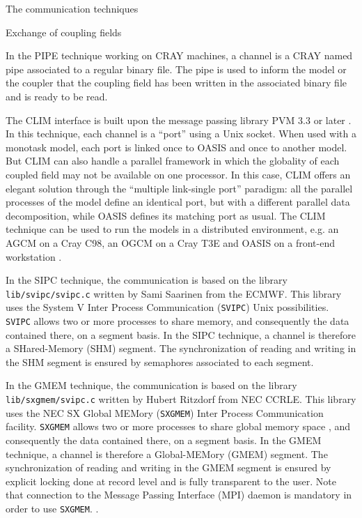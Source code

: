\begin{subsection}{The communication techniques}
\begin{subsubsection}{Exchange of coupling fields}
\vspace{0.4cm}

In the PIPE technique working on CRAY machines, a channel is a CRAY 
named pipe associated to a regular
binary file. The pipe is used to inform the model or the coupler
that the coupling field has been written in the associated binary
file and is ready to be read. 

\vspace{0.4cm}

The CLIM interface is built upon the message passing library PVM 3.3
or later \cite{ecmwf}. In this technique, each channel is a ``port'' using a Unix
socket. When used with a monotask model, each port is
linked once to OASIS and once to another model. But CLIM can also
handle a parallel framework in which the globality of each coupled
field may not be available on one processor. In this case, CLIM offers
an elegant solution through the ``multiple link-single port''
paradigm: all the parallel processes of the model define an identical
port, but with a different parallel data decomposition, while OASIS
defines its matching port as usual. 
The CLIM technique can be used to run the models in a distributed environment,
e.g. an AGCM on a Cray C98, an OGCM on a Cray T3E and OASIS on a 
front-end workstation \cite{cassou}.

\vspace{0.4cm}
In the SIPC technique, the communication is based on the library 
{\tt lib/svipc/svipc.c} written by Sami Saarinen from the ECMWF. This library 
uses the System V Inter Process Communication ({\tt SVIPC}) Unix
possibilities. {\tt SVIPC} allows two or more processes to share
memory, and consequently the data contained there, on a segment basis.
In the SIPC technique, a channel is therefore a SHared-Memory (SHM)
segment. The synchronization of reading and writing in the SHM segment
is ensured by semaphores associated to each segment.

\vspace{0.4cm}
In the GMEM technique, the communication is based on the library 
{\tt lib/sxgmem/svipc.c} written by Hubert Ritzdorf from NEC CCRLE. 
This library uses the NEC SX Global MEMory ({\tt SXGMEM}) 
Inter Process Communication
facility. {\tt SXGMEM} allows two or more processes to share global
memory space , and consequently the data contained there, on a segment basis.
In the GMEM technique, a channel is therefore a Global-MEMory (GMEM)
segment. The synchronization of reading and writing in the GMEM segment
is ensured by explicit locking done at record level and is fully
transparent to the user. Note that connection to the Message Passing
Interface (MPI) daemon is mandatory in order to use {\tt SXGMEM}.
.
\end{subsubsection}


\end{subsection}
